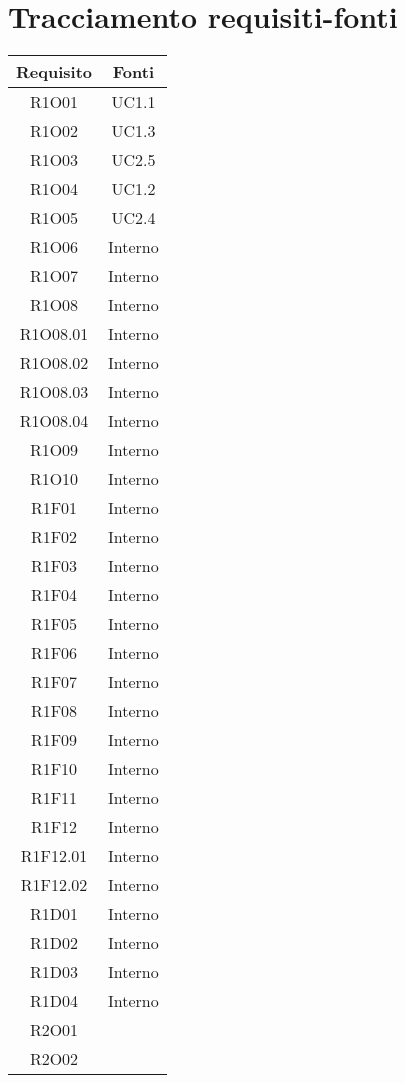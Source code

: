 \section{Tracciamento requisiti-fonti}
\begin{tabularx}{\textwidth}{|C|C|}
	\hline
	\textbf{Requisito} & \textbf{Fonti} \\
	\hline
	\endhead
	R1O01& UC1.1\\
	\hline
	R1O02& UC1.3\\
	\hline
	R1O03& UC2.5\\
	\hline
	R1O04& UC1.2\\
	\hline
	R1O05& UC2.4\\
	\hline
	R1O06& Interno\\
	\hline
	R1O07& Interno\\
	\hline	
	R1O08& Interno\\
	\hline
	R1O08.01& Interno\\
	\hline	
	R1O08.02& Interno\\
	\hline		
	R1O08.03& Interno\\
	\hline		
	R1O08.04& Interno\\
	\hline	
	R1O09& Interno\\
	\hline	
	R1O10& Interno\\
	\hline
	R1F01& Interno\\
	\hline
	R1F02& Interno\\
	\hline
	R1F03& Interno\\
	\hline
	R1F04& Interno\\
	\hline
	R1F05& Interno\\
	\hline
	R1F06& Interno\\
	\hline
	R1F07& Interno\\
	\hline
	R1F08& Interno\\
	\hline
	R1F09& Interno\\
	\hline
	R1F10& Interno\\
	\hline
	R1F11& Interno\\
	\hline
	R1F12& Interno\\
	\hline
	R1F12.01& Interno\\
	\hline
	R1F12.02& Interno\\
	\hline
	R1D01& Interno\\
	\hline
	R1D02& Interno\\
	\hline
	R1D03& Interno\\
	\hline
	R1D04& Interno\\
	\hline
	R2O01&\\
	\hline
	R2O02&\\

\end{tabularx}
